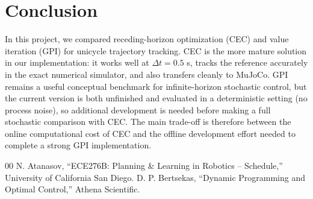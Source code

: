 \documentclass[conference]{IEEEtran}
\begin{document}
\section{Conclusion}
In this project, we compared receding-horizon optimization (CEC) and value iteration (GPI) for unicycle trajectory tracking. CEC is the more mature solution in our implementation: it works well at $\Delta t = 0.5$ s, tracks the reference accurately in the exact numerical simulator, and also transfers cleanly to MuJoCo. GPI remains a useful conceptual benchmark for infinite-horizon stochastic control, but the current version is both unfinished and evaluated in a deterministic setting (no process noise), so additional development is needed before making a full stochastic comparison with CEC. The main trade-off is therefore between the online computational cost of CEC and the offline development effort needed to complete a strong GPI implementation.

\begin{thebibliography}{00}
 N. Atanasov, ``ECE276B: Planning \& Learning in Robotics -- Schedule,'' University of California San Diego.
 D. P. Bertsekas, ``Dynamic Programming and Optimal Control,'' Athena Scientific.
\end{thebibliography}
\end{document}
